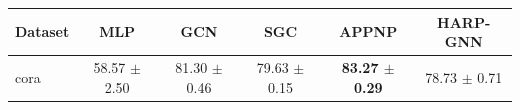 \begin{tabular}{lccccc}
\toprule
Dataset & MLP & GCN & SGC & APPNP & HARP-GNN \\
\midrule
cora & 58.57 $\pm$ 2.50 & 81.30 $\pm$ 0.46 & 79.63 $\pm$ 0.15 & \textbf{83.27 $\pm$ 0.29} & 78.73 $\pm$ 0.71 \\
\bottomrule
\end{tabular}
